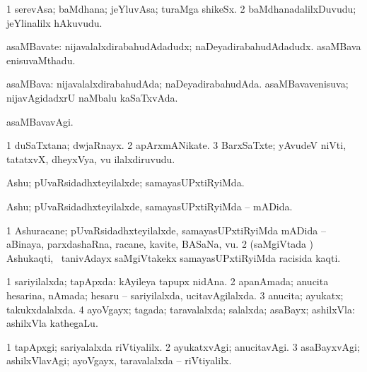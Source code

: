 \bentry
{}
\gl{\nA}
\bmng
\bnum
\num{1} serevAsa; baMdhana; jeYluvAsa; turaMga shikeSx. 
\num{2} baMdhanadalilxDuvudu; jeYlinalilx hAkuvudu. 
\enum
\emng
\eentry

\bentry
{}
\gl{\nA}
\bmng
asaMBavate: 
\banum
{} nijavalalxdirabahudAdadudx; naDeyadirabahudAdadudx. 
 asaMBava enisuvaMthadu. 
\eanum
\emng
\eentry

\bentry
{}
\gl{\gu}
\bmng
asaMBava: 
\banum
{} nijavalalxdirabahudAda; naDeyadirabahudAda. 
 asaMBavavenisuva; nijavAgidadxrU naMbalu kaSaTxvAda. 
\eanum
\emng
\eentry

\bentry
{}
\gl{\kirxvi}
\bmng
asaMBavavAgi. 
\emng
\eentry

\bentry
{}
\gl{\nA}
\bmng
\bnum
\num{1} duSaTxtana; dwjaRnayx. 
\num{2} apArxmANikate. 
\num{3} BarxSaTxte; yAvudeV niVti, tatatxvX, dheyxVya, \mo vu ilalxdiruvudu. 
\enum
\emng
\eentry

\bentry
{}
\gl{\kirxvi}
\bmng
Ashu; pUvaRsidadhxteyilalxde; samayasUPxtiRyiMda. 
\emng
\eentry

\bentry
{}
\gl{\gu}
\bmng
Ashu; pUvaRsidadhxteyilalxde, samayasUPxtiRyiMda -- mADida. 
\emng
\eentry

\bentry
{}
\gl{\nA}
\bmng
\bnum
\num{1} Ashuracane; pUvaRsidadhxteyilalxde, samayasUPxtiRyiMda mADida -- aBinaya, parxdashaRna, racane, kavite, BASaNa, \mo vu. 
\num{2} (saMgiVtada \vi) Ashukaqti, \kanmu\ tanivAdayx saMgiVtakekx samayasUPxtiRyiMda racisida kaqti. 
\enum
\emng
\eentry

\bentry
{}
\gl{\gu}
\bmng
\bnum
\num{1} sariyilalxda; tapApxda:  kAyileya tapupx nidAna. 
\num{2} apanAmada; anucita hesarina, nAmada; hesaru -- sariyilalxda, ucitavAgilalxda. 
\num{3} anucita; ayukatx; takukxdalalxda. 
\num{4} ayoVgayx; tagada; taravalalxda; salalxda; asaBayx; ashilxVla:  ashilxVla kathegaLu. 
\enum
\emng
\eentry

\bentry
{}
\gl{\kirxvi}
\bmng
\bnum
\num{1} tapApxgi; sariyalalxda riVtiyalilx. 
\num{2} ayukatxvAgi; anucitavAgi. 
\num{3} asaBayxvAgi; ashilxVlavAgi; ayoVgayx, taravalalxda -- riVtiyalilx. 
\enum
\emng
\eentry

